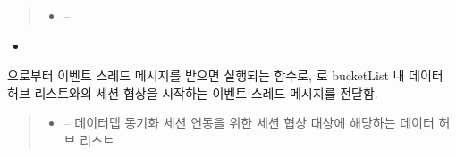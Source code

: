 \documentclass[a4paper,10pt,english]{sphinxmanual}
\begin{document}
\begin{fulllineitems}
\begin{fulllineitems}
\begin{quote}
\begin{description}
\begin{itemize}
\item {} 
\sphinxAtStartPar
{} – 

\end{itemize}

\end{description}\end{quote}


\nopagebreak

\begin{itemize}
\item {} 
\sphinxAtStartPar
{\hyperref[\detokenize{_SessionRequester:SessionRequester._smTransmitNegotiationResult}]{}}

\end{itemize}



\end{fulllineitems}


\begin{fulllineitems}
\label{\detokenize{_SessionManager:SessionManager._srStartSessionConnection}}
\pysigstartsignatures
{}
\pysigstopsignatures
\sphinxAtStartPar
{\hyperref[\detokenize{_DHDaemon:dhdaemon}]{}} 으로부터  이벤트 스레드 메시지를 받으면 실행되는 함수로,
{\hyperref[\detokenize{_SessionRequester:sessionrequester}]{}} 로 bucketList 내 데이터 허브 리스트와의 세션 협상을 시작하는  이벤트 스레드 메시지를 전달함.
\begin{quote}\begin{description}
\begin{itemize}
\item {} 
\sphinxAtStartPar
{} – 데이터맵 동기화 세션 연동을 위한 세션 협상 대상에 해당하는 데이터 허브 리스트


\end{itemize}
\end{description}
\end{quote}
\end{fulllineitems}
\end{fulllineitems}
\end{document}
